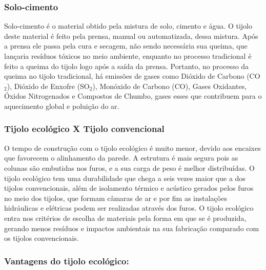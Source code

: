 \subsubsection*{\textbf{Solo-cimento}}
	
	Solo-cimento é o material obtido pela mistura de solo, cimento e água. O tijolo deste material é feito pela prensa, manual ou automatizada, dessa mistura. Após a prensa ele passa pela cura e secagem, não sendo necessária sua queima, que lançaria resíduos tóxicos no meio ambiente, enquanto no processo tradicional é feito a queima do tijolo logo após a saída da prensa. Portanto, no processo da queima no tijolo tradicional, há emissões de gases como Dióxido de Carbono (CO$_2$), Dióxido de Enxofre (SO$_2$), Monóxido de Carbono (CO), Gases Oxidantes, Óxidos Nitrogenados e Compostos de Chumbo, gases esses que contribuem para o aquecimento global e poluição do ar\cite{1980Portland}.\\

\subsubsection*{\textbf{Tijolo ecológico X Tijolo convencional}}
	O tempo de construção com o tijolo ecológico é muito menor, devido aos encaixes que favorecem o alinhamento da parede. A estrutura é mais segura pois as colunas são embutidas nos furos, e a sua carga de peso é melhor distribuídas. O tijolo ecológico tem uma durabilidade que chega a seis vezes maior que a dos tijolos convencionais, além de isolamento térmico e acústico gerados pelos furos no meio dos tijolos, que formam câmaras de ar e por fim as instalações hidráulicas e elétricas podem ser realizadas através dos furos. O tijolo ecológico entra nos critérios de escolha de materiais pela forma em que se é produzida, gerando menos resíduos e impactos ambientais na sua fabricação comparado com os tijolos convencionais.




\subsubsection*{\textbf{Vantagens do tijolo ecológico:}}
	
